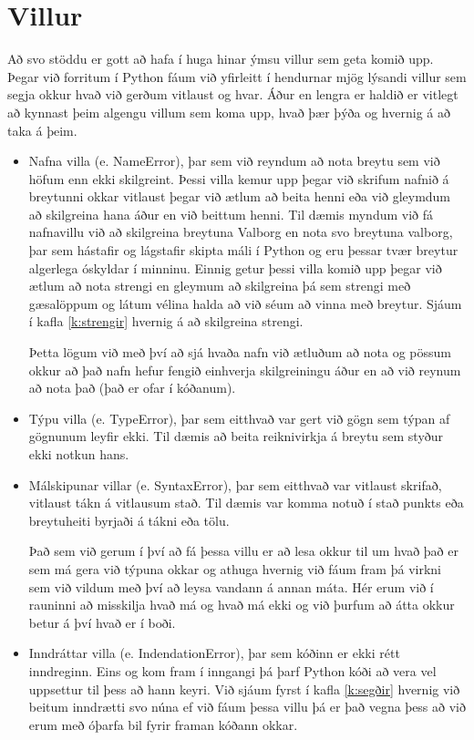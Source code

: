 \section{Villur}\label{uk:tolur-villur}
Að svo stöddu er gott að hafa í huga hinar ýmsu villur sem geta komið upp.
Þegar við forritum í Python fáum við yfirleitt í hendurnar mjög lýsandi villur sem segja okkur hvað við gerðum vitlaust og hvar.
Áður en lengra er haldið er vitlegt að kynnast þeim algengu villum sem koma upp, hvað þær þýða og hvernig á að taka á þeim.

\begin{itemize}
	\item Nafna villa (e. NameError), þar sem við reyndum að nota breytu sem við höfum enn ekki skilgreint.
	Þessi villa kemur upp þegar við skrifum nafnið á breytunni okkar vitlaust þegar við ætlum að beita henni eða við gleymdum að skilgreina hana áður en við beittum henni.
	Til dæmis myndum við fá nafnavillu við að skilgreina breytuna Valborg en nota svo breytuna valborg, þar sem hástafir og lágstafir skipta máli í Python og eru þessar tvær breytur algerlega óskyldar í minninu.
	Einnig getur þessi villa komið upp þegar við ætlum að nota strengi en gleymum að skilgreina þá sem strengi með gæsalöppum og látum vélina halda að við séum að vinna með breytur.
	Sjáum í kafla \ref{k:strengir} hvernig á að skilgreina strengi.
	
	Þetta lögum við með því að sjá hvaða nafn við ætluðum að nota og pössum okkur að það nafn hefur fengið einhverja skilgreiningu áður en að við reynum að nota það (það er ofar í kóðanum).
	
	\item Týpu villa (e. TypeError), þar sem eitthvað var gert við gögn sem týpan af gögnunum leyfir ekki.
	Til dæmis að beita reiknivirkja á breytu sem styður ekki notkun hans.
	\item Málskipunar villar (e. SyntaxError), þar sem eitthvað var vitlaust skrifað, vitlaust tákn á vitlausum stað.
	Til dæmis var komma notuð í stað punkts eða breytuheiti byrjaði á tákni eða tölu.
	
	Það sem við gerum í því að fá þessa villu er að lesa okkur til um hvað það er sem má gera við týpuna okkar og athuga hvernig við fáum fram þá virkni sem við vildum með því að leysa vandann á annan máta.
	Hér erum við í rauninni að misskilja hvað má og hvað má ekki og við þurfum að átta okkur betur á því hvað er í boði.
	
	\item Inndráttar villa (e. IndendationError), þar sem kóðinn er ekki rétt inndreginn.
	Eins og kom fram í inngangi þá þarf Python kóði að vera vel uppsettur til þess að hann keyri.
	Við sjáum fyrst í kafla \ref{k:segðir} hvernig við beitum inndrætti svo núna ef við fáum þessa villu þá er það vegna þess að við erum með óþarfa bil fyrir framan kóðann okkar. 
	

\end{itemize}
